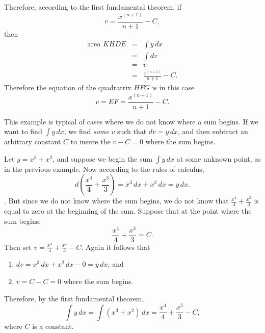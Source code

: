 Therefore, according to the first fundamental theorem, if 
$$v = \frac{x^{(n+1)}}{n+1}- C,$$
then
\begin{eqnarray*}
\mbox{area }KHDE & = & \int\!y\,dx\\
& = & \int\!dv\\
&  = & v\\
& = & \frac{x^{(n+1)}}{n+1} -C.
\end{eqnarray*}
\setlength{\jot}{\oldjot}
Therefore the equation of the quadratrix $HFG$ is in this case 
$$v= EF = \frac{x^{(n+1)}}{n+1} -C .$$

This example is typical of cases where we do not know where a sum begins.  If we want to find $\int y\,dx$, we find {\it some} $v$ such that $dv = y\,dx$, and then subtract an arbitrary constant $C$ to insure the $v - C = 0$ where the sum begins.  



\item Let $y = x^3 + x^2$, and suppose we begin the sum $\int y\,dx$ at some unknown point, as in the previous example. 
Now 
according to the rules of calculus,
$$d\left(\frac{x^4}{4} + \frac{x^3}{3}\right) = x^3\,dx + x^2\,dx  = y\,dx.$$. 
But since we do not know where the sum begins, we do not know that $\frac{x^4}{4} + \frac{x^3}{3}$ is equal to zero at the beginning of the sum.  Suppose that at the point where the sum begins,
$$\frac{x^4}{4} + \frac{x^3}{3} = C.$$ 
  Then set
$v = \frac{x^4}{4} + \frac{x^3}{3} -C$.
Again it follows that 
\begin{enumerate}
\item $dv = x^3\,dx + x^2\,dx  - 0 = y\,dx$, and
\item $v = C - C = 0$ where the sum begins.
\end{enumerate}
Therefore, by the first fundamental theorem,
$$\int y\,dx = \int \left(x^3 + x^2\right)\,dx = \frac{x^4}{4} + \frac{x^3}{3} -C,$$
where $C$ is a constant.



